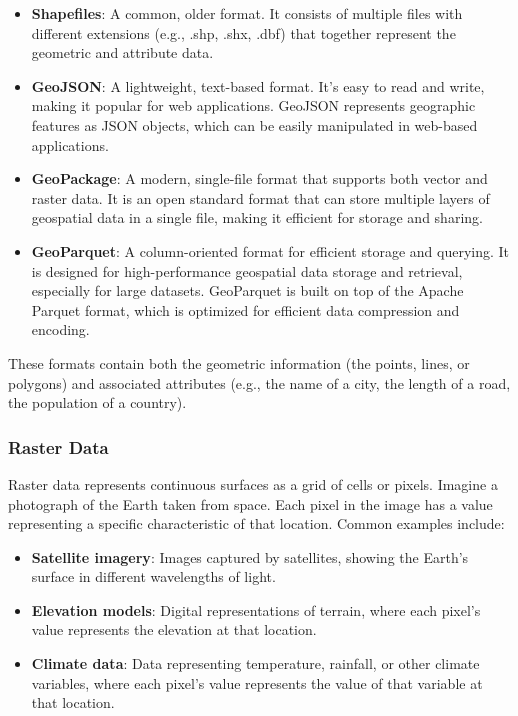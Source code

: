 \begin{itemize}
\item \textbf{Shapefiles}: A common, older format. It consists of multiple files with different extensions (e.g., .shp, .shx, .dbf) that together represent the geometric and attribute data.
\item \textbf{GeoJSON}: A lightweight, text-based format. It's easy to read and write, making it popular for web applications. GeoJSON represents geographic features as JSON objects, which can be easily manipulated in web-based applications.
\item \textbf{GeoPackage}: A modern, single-file format that supports both vector and raster data. It is an open standard format that can store multiple layers of geospatial data in a single file, making it efficient for storage and sharing.
\item \textbf{GeoParquet}: A column-oriented format for efficient storage and querying. It is designed for high-performance geospatial data storage and retrieval, especially for large datasets. GeoParquet is built on top of the Apache Parquet format, which is optimized for efficient data compression and encoding.
\end{itemize}

These formats contain both the geometric information (the points, lines, or polygons) and associated attributes (e.g., the name of a city, the length of a road, the population of a country).

\subsubsection{Raster Data}

Raster data represents continuous surfaces as a grid of cells or pixels. Imagine a photograph of the Earth taken from space. Each pixel in the image has a value representing a specific characteristic of that location. Common examples include:

\begin{itemize}
\item \textbf{Satellite imagery}: Images captured by satellites, showing the Earth's surface in different wavelengths of light.
\item \textbf{Elevation models}: Digital representations of terrain, where each pixel's value represents the elevation at that location.
\item \textbf{Climate data}: Data representing temperature, rainfall, or other climate variables, where each pixel's value represents the value of that variable at that location.
\end{itemize}

